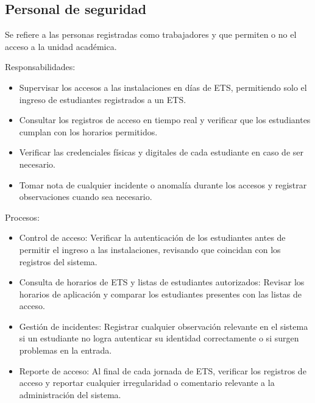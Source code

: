 \begin{Usuario}{\hypertarget{tPersonalSeguridad}{\subsection{Personal de seguridad}}}{
		Se refiere a las personas registradas como trabajadores y que permiten o no el acceso a la unidad académica.
	}
	\item[Responsabilidades:] \cdtEmpty
	\begin{itemize}
		\item Supervisar los accesos a las instalaciones en días de ETS, permitiendo solo el ingreso de estudiantes registrados a un ETS.
		\item Consultar los registros de acceso en tiempo real y verificar que los estudiantes cumplan con los horarios permitidos.
		\item Verificar las credenciales físicas y digitales de cada estudiante en caso de ser necesario.
		\item Tomar nota de cualquier incidente o anomalía durante los accesos y registrar observaciones cuando sea necesario.
	\end{itemize}
	
	\item[Procesos:] \cdtEmpty
	\begin{itemize}
		\item Control de acceso: Verificar la autenticación de los estudiantes antes de permitir el ingreso a las instalaciones, revisando que coincidan con los registros del sistema.
		\item Consulta de horarios de ETS y listas de estudiantes autorizados: Revisar los horarios de aplicación y comparar los estudiantes presentes con las listas de acceso.
		\item Gestión de incidentes: Registrar cualquier observación relevante en el sistema si un estudiante no logra autenticar su identidad correctamente o si surgen problemas en la entrada.
		\item Reporte de acceso: Al final de cada jornada de ETS, verificar los registros de acceso y reportar cualquier irregularidad o comentario relevante a la administración del sistema.
	\end{itemize}
\end{Usuario}

